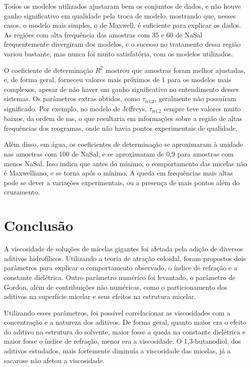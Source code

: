 		Todos os modelos utilizados ajustaram bem os conjuntos de dados, e não houve ganho significativo em qualidade pela troca de modelo, mostrando que, nesses casos, o modelo mais simples, o de Maxwell, é suficiente para explicar os dados. As regiões com alta frequência das amostras com 35 e 60 \mM{} de NaSal frequentemente divergiram dos modelos, e o sucesso no tratamento dessa região variou bastante, mas nunca foi muito satisfatória, com os modelos utilizados.
		
		O coeficiente de determinação \(R^2\) mostrou que amostras foram melhor ajustadas, e, de forma geral, forneceu valores mais próximos de 1 para os modelos mais complexos, apesar de não haver um ganho significativo no entendimento desses sistemas. Os parâmetros extras obtidos, como \(\tau_{\textrm{rel,2}}\), geralmente não possuíram significado. Por exemplo, no modelo de Jeffreys, \(\tau_{\textrm{rel,2}}\) sempre teve valores muito baixos, da ordem de ms, o que resultaria em informações sobre a região de altas frequências dos reogramas, onde não havia pontos experimentais de qualidade.
		
		Além disso, em água, os coeficientes de determinação se aproximaram à unidade nas amostras com 100 \mM{} de NaSal, e se aproximaram de 0,9 para amostras com menos NaSal. Isso indica que antes do mínimo, o comportamento das micelas não é Maxwelliano, e se torna após o mínimo. A queda em frequências mais altas pode se dever a variações experimentais, ou a presença de mais pontos além do cruzamento.

	\chapter{Conclusão}
	
		A viscosidade de soluções de micelas gigantes foi afetada pela adição de diversos aditivos hidrofílicos. Utilizando a teoria de atração coloidal, foram propostos dois parâmetros para explicar o comportamento observado, o índice de refração e a constante dielétrica. Outro parâmetro numérico foi levantado, o parâmetro de Gordon, além de contribuições não numéricas, como o particionamento dos aditivos na superfície micelar e seus efeitos na estrutura micelar.
		
		Utilizando esses parâmetros, foi possível correlacionar as viscosidades com a concentração e a natureza dos aditivos. De forma geral, quanto maior era o efeito do aditivo na estrutura do solvente, maior fosse a queda na constante dielétrica e maior fosse o índice de refração, menor era a viscosidade. O 1,3-butanodiol, dos aditivos estudados, mais fortemente diminuía a viscosidade das micelas, já a sacarose não afetou a viscosidade.
		
